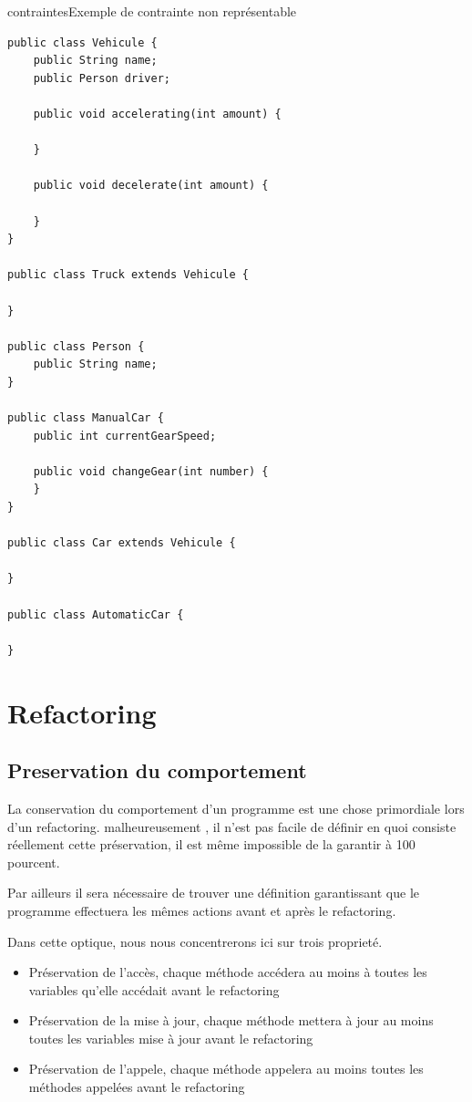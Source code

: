 \documentclass[a4paper, 12pt]{article}
\begin{document}
\begin{figu}{contraintes}{Exemple de contrainte non représentable}
\begin{lstlisting}[frame=single]
public class Vehicule {
	public String name;
	public Person driver;

	public void accelerating(int amount) {

	}

	public void decelerate(int amount) {

	}
}

public class Truck extends Vehicule {

}

public class Person {
	public String name;
}

public class ManualCar {
	public int currentGearSpeed;

	public void changeGear(int number) {
	}
}

public class Car extends Vehicule {

}

public class AutomaticCar {

}
\end{lstlisting}

\newpage
\section{Refactoring}

\subsection{Preservation du comportement}
\label{subsec:preservationDuComportement}

La conservation du comportement d'un programme est une chose primordiale lors d'un refactoring. malheureusement , il n'est pas facile de définir en quoi consiste réellement cette préservation, il est même impossible de la garantir à 100 pourcent.

Par ailleurs il sera nécessaire de trouver une définition garantissant que le programme effectuera les mêmes actions avant et après le refactoring.

Dans cette optique, nous nous concentrerons ici sur trois proprieté.

\begin{itemize}[label=\textbullet]
\item Préservation de l'accès, chaque méthode accédera au moins à toutes les variables qu'elle accédait avant le refactoring
\item Préservation de la mise à jour, chaque méthode mettera à jour au moins toutes les variables mise à jour avant le refactoring
\item Préservation de l'appele, chaque méthode appelera au moins toutes les méthodes appelées avant le refactoring
\end{itemize}


\end{figu}
\end{document}
